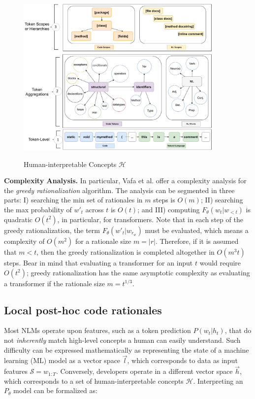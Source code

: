 \begin{figure}[t]
\caption{Human-interpretable Concepts $\mathcal{H}$ }
\centering
\includegraphics[width=0.9\textwidth]{graphics/chap_08-interpret-rational/fig_1_humanConcepts.pdf}
\label{fig:human}
\end{figure}


\textbf{Complexity Analysis.} In particular, Vafa et al. offer a complexity analysis for the \textit{greedy rationalization} algorithm. The analysis can be segmented in three parts: I) searching the min set of rationales in $m$ steps is $O(m)$; II) searching the max probability of $w'_t$ across $t$ is $O(t)$; and III) computing $F_{\theta}(w_t|w_{<t})$ is quadratic $O(t^2)$, in particular, for transformers. Note that in each step of the greedy rationalization, the term $F_{\theta}(w'_t|w_{r_w})$ must be evaluated, which means a complexity of $O(m^2)$ for a rationale size $m = |r|$. Therefore, if it is assumed that $m < t$, then the greedy rationalization is completed altogether in $O(m^3t)$ steps. Bear in mind that evaluating a transformer for an input $t$ would require $O(t^2)$; greedy rationalization has the same asymptotic complexity as evaluating a transformer if the rationale size $m=t^{1/3}$.

\subsection{Local post-hoc code rationales}

Most NLMs operate upon features, such as a token prediction $P(w_t|h_t)$, that do not \textit{inherently} match high-level concepts a human can easily understand. Such difficulty can be expressed mathematically as representing the state of a machine learning (ML) model as a vector space $\Vec{l}$, which corresponds to data as input features $\mathcal{S} = w_{1:T}$. Conversely, developers operate in a different vector space $\Vec{h}$, which corresponds to a set of human-interpretable concepts $\mathcal{H}$. Interpreting an $P_{\theta}$ model can be formalized as:

